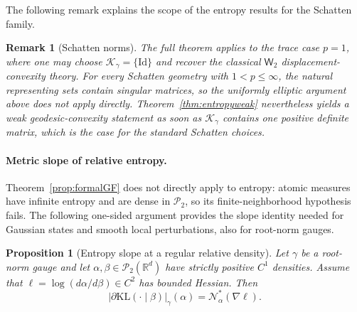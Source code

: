 \documentclass{article}
\newtheorem{proposition}[theorem]{Proposition}
\newtheorem{remark}[theorem]{Remark}
\newcommand{\R}{\mathbb{R}}
\newcommand{\cP}{\mathcal{P}}
\newcommand{\MN}{\mathcal{N}}
\newcommand{\Wtwo}{\mathsf{W}_2}
\newcommand{\Id}{\mathrm{Id}}
\newcommand{\cK}{\mathcal K_\gamma}
\newcommand{\KL}{\mathrm{KL}}
\begin{document}
The following remark explains the scope of the entropy results for the Schatten family.
\begin{remark}[Schatten norms]
The full theorem applies to the trace case $p=1$, where one may choose $\cK=\{\Id\}$ and recover the classical $\Wtwo$ displacement-convexity theory. For every Schatten geometry with $1<p\le \infty$, the natural representing sets contain singular matrices, so the uniformly elliptic argument above does not apply directly. Theorem~\ref{thm:entropyweak} nevertheless yields a weak geodesic-convexity statement as soon as $\cK$ contains one positive definite matrix, which is the case for the standard Schatten choices.
\end{remark}



\paragraph{Metric slope of relative entropy.}
Theorem~\ref{prop:formalGF} does not directly apply to entropy: atomic
measures have infinite entropy and are dense in $\cP_2$, so its
finite-neighborhood hypothesis fails. The following one-sided argument
provides the slope identity needed for Gaussian states and smooth local
perturbations, also for root-norm gauges.

\begin{proposition}[Entropy slope at a regular relative density]
\label{prop:entropy-slope}
Let $\gamma$ be a root-norm gauge and let $\alpha,\beta\in\cP_2(\R^d)$ have
strictly positive $C^1$ densities. Assume that
$\ell=\log(d\alpha/d\beta)\in C^2$ has bounded Hessian. Then
\[
 |\partial\KL(\cdot\mid\beta)|_\gamma(\alpha)
 =\MN_\alpha^*(\nabla\ell).
\]
\end{proposition}
\end{document}
